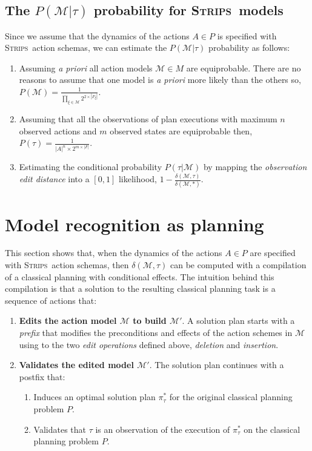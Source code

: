 \documentclass[letterpaper]{article} %
\newcommand{\strips}{\textsc{Strips}}     %
\begin{document}
\subsection{The $P(\mathcal{M}|\tau)$ probability for \strips\ models}
Since we assume that the dynamics of the actions $A\in P$ is specified with \strips\ action schemas, we can estimate the $P(\mathcal{M}|\tau)$ probability as follows:
\begin{enumerate}
\item Assuming {\em a priori} all action models $\mathcal{M}\in M$ are equiprobable. There are no reasons to assume that one model is {\em a priori} more likely than the others so, $P(\mathcal{M})=\frac{1}{\prod_{\xi\in\mathcal{M}} 2^{2\times|F_{\xi}|}}$.
\item Assuming that all the observations of plan executions with maximum $n$ observed actions and $m$ observed states are equiprobable then, $P(\tau)=\frac{1}{|A|^{n}\times2^{m\times|F|}}$.
\item Estimating the conditional probability $P(\tau|\mathcal{M})$ by mapping the {\em observation edit distance} into a $[0,1]$ likelihood, $1-\frac{\delta(\mathcal{M},\tau)}{\delta(\mathcal{M},*)}$.
\end{enumerate}



\section{Model recognition as planning}
This section shows that, when the dynamics of the actions $A\in P$ are specified with \strips\ action schemas, then $\delta(\mathcal{M},\tau)$ can be computed with a compilation of a classical planning with conditional effects. The intuition behind this compilation is that a solution to the resulting classical planning task is a sequence of actions that:
\begin{enumerate}
\item {\bf Edits the action model $\mathcal{M}$ to build $\mathcal{M}'$}. A solution plan starts with a {\em prefix} that modifies the preconditions and effects of the action schemes in $\mathcal{M}$ using to the two {\em edit operations} defined above, {\em deletion} and {\em insertion}. 
\item {\bf Validates the edited model $\mathcal{M}'$}. The solution plan continues with a postfix that:
\begin{enumerate}
\item Induces an optimal solution plan $\pi^*_\tau$ for the original classical planning problem $P$.
\item Validates that $\tau$ is an observation of the execution of $\pi^*_\tau$ on the classical planning problem $P$.
\end{enumerate}
\end{enumerate}
\end{document}
